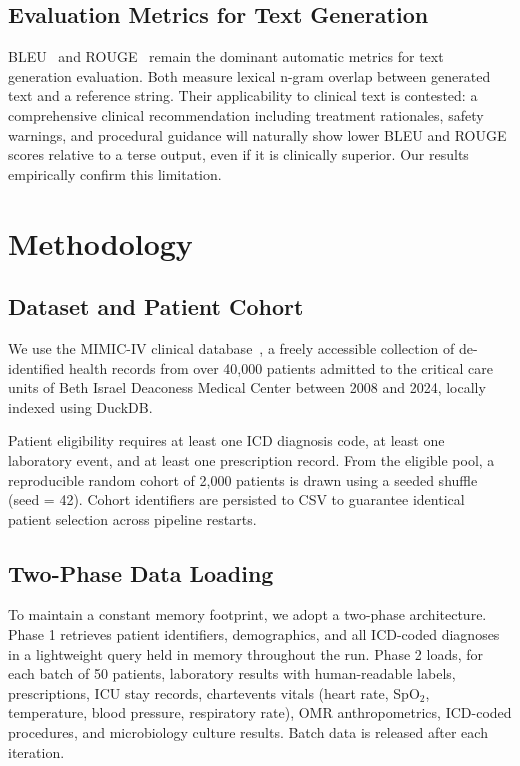 \documentclass[10pt, twocolumn, a4paper]{article}
\begin{document}
\subsection{Evaluation Metrics for Text Generation}
BLEU~\cite{bleu} and ROUGE~\cite{rouge} remain the dominant automatic metrics for text generation evaluation. Both measure lexical n-gram overlap between generated text and a reference string. Their applicability to clinical text is contested: a comprehensive clinical recommendation including treatment rationales, safety warnings, and procedural guidance will naturally show lower BLEU and ROUGE scores relative to a terse output, even if it is clinically superior. Our results empirically confirm this limitation.

\section{Methodology}

\subsection{Dataset and Patient Cohort}
We use the MIMIC-IV clinical database~\cite{mimic4}, a freely accessible collection of de-identified health records from over 40,000 patients admitted to the critical care units of Beth Israel Deaconess Medical Center between 2008 and 2024, locally indexed using DuckDB.

Patient eligibility requires at least one ICD diagnosis code, at least one laboratory event, and at least one prescription record. From the eligible pool, a reproducible random cohort of 2,000 patients is drawn using a seeded shuffle (seed = 42). Cohort identifiers are persisted to CSV to guarantee identical patient selection across pipeline restarts.

\subsection{Two-Phase Data Loading}
To maintain a constant memory footprint, we adopt a two-phase architecture. Phase 1 retrieves patient identifiers, demographics, and all ICD-coded diagnoses in a lightweight query held in memory throughout the run. Phase 2 loads, for each batch of 50 patients, laboratory results with human-readable labels, prescriptions, ICU stay records, chartevents vitals (heart rate, SpO$_2$, temperature, blood pressure, respiratory rate), OMR anthropometrics, ICD-coded procedures, and microbiology culture results. Batch data is released after each iteration.
\end{document}
